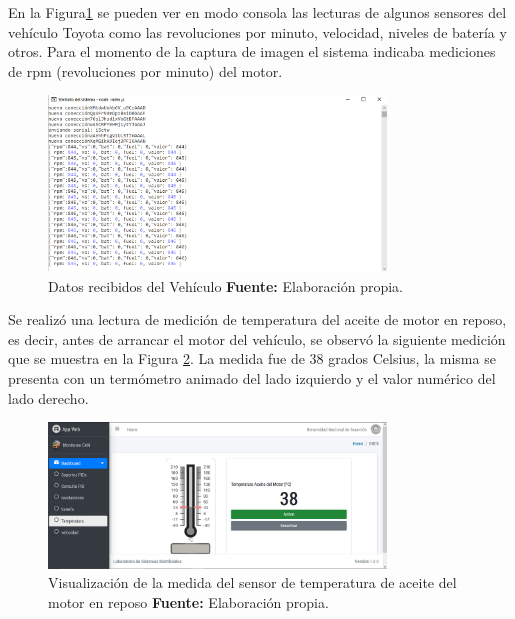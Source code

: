 En la Figura\ref{consola_ref_c6} se pueden ver en modo consola las lecturas de algunos sensores del vehículo Toyota como las revoluciones por minuto, velocidad, niveles de batería y otros. 
Para el momento de la captura de imagen el sistema indicaba mediciones de rpm (revoluciones por minuto) del motor. 

\begin{figure}[H]
	\centering
	\includegraphics[width=0.8\textwidth]{./Cap6imagen/consola_fig_c6.png}
	\caption [Datos recibidos del Vehículo.]{Datos recibidos del Vehículo \textbf{ Fuente:} %
		Elaboración propia.}
	\label{consola_ref_c6} %
\end{figure}


 Se realizó una lectura de medición de temperatura del aceite de motor en reposo, es decir, antes de arrancar el motor del vehículo, se observó la siguiente medición que se muestra en la Figura \ref{temp_ref_c6}. 
 La medida fue de 38 grados Celsius, la misma se presenta con un termómetro animado del lado izquierdo y el valor numérico del lado derecho.
 
 \begin{figure}[H]
	\centering
	\includegraphics[width=0.8\textwidth]{./Cap6imagen/temp_fig_c6.png}
	\caption [Visualización de la medida del sensor de temperatura de aceite del motor en reposo.]{Visualización de la medida del sensor de temperatura de aceite del motor en reposo \textbf{ Fuente:} %
		Elaboración propia.}
	\label{temp_ref_c6} %
\end{figure}

